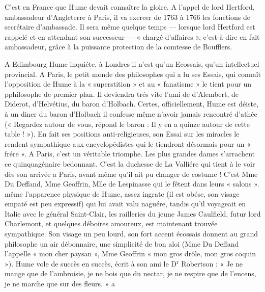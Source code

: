 C’est en France que Hume devait connaître la
gloire. A l’appel de lord Hertford, ambassadeur
d’Angleterre à Paris, il va exercer de 1763 à 1766
les fonctions de secrétaire d’ambassade. Il sera
même quelque temps — lorsque lord Hertford
est rappelé et en attendant son successeur — « chargé
d’affaires », c’est-à-dire en fait ambassadeur, grâce
à la puissante protection de la comtesse de Boufflers.

A Edimbourg Hume inquiéte, à Londres il n’est
qu’un Ecossais, qu’un intellectuel provincial. A
Paris, le petit monde des philosophes qui a lu ses
Essais, qui connaît l’opposition de Hume à la
« superstition » et au « fanatisme » le tient pour un
pphilosophe de premier plan. Il deviendra trés vite
l'ami de d’Alembert, de Diderot, d’Helvétius, du
baron d’Holbach. Certes, officiellement, Hume est
déiste, à un diner du baron d’Holbach il confesse
même n’avoir jamais rencontré d’athée (« Regardez
autour de vous, répond le baron : Il y en a quinze
autour de cette table ! »). En fait ses positions anti-religieuses,
son Essai sur les miracles le rendent
sympathique aux encyclopédistes qui le tiendront
désormais pour un « frére ». A Paris, c’est un véritable
triomphe. Les plus grandes dames s’arrachent ce
quinquagénaire bedonnant. C’est la duchesse de
La Valliére qui tient à le voir dès son arrivée a Paris,
avant même qu’il ait pu changer de costume !
C’est Mme Du Deffand, Mme Geoffrin, Mlle de Lespinasse
qui le fêtent dans leurs « salons ». même
l'apparence physique de Hume, assez ingrate (il
est obése, son visage empaté est peu expressif)
qui lui avait valu naguére, tandis qu’il voyageait
en Italie avec le général Saint-Clair, les railleries
du jeune James Caulfield, futur lord Charlemont,
et quelques déboires amoureux, est maintenant
trouvée sympathique. Son visage un peu lourd, son
fort accent écossais donnent au grand philosophe
un air débonnaire, une simplicité de bon aloi
(Mme Du Deffand l'appelle « mon cher paysan »,
Mme Geoffrin « mon gros drôle, mon gros coquin »).
Hume vole de succès en succès, écrit à son ami le
D$^\text{r}$ Robertson : « Je ne mange que de l’ambroisie,
je ne bois que du nectar, je ne respire que de l’encens,
je ne marche que sur des fleurs. » a

